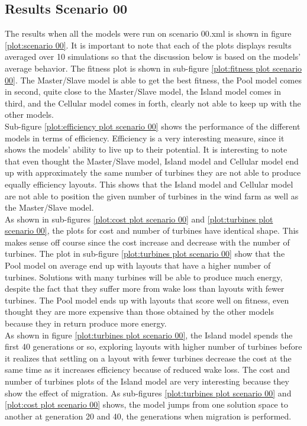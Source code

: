 \subsection{Results Scenario 00}
The results when all the models were run on scenario 00.xml is shown in figure \ref{plot:scenario 00}. It is important to note that each of the plots displays results averaged over 10 simulations so that the discussion below is based on the models' average behavior. The fitness plot is shown in sub-figure \ref{plot:fitness plot scenario 00}. The Master/Slave model is able to get the best fitness, the Pool model comes in second, quite close to the Master/Slave model, the Island model comes in third, and the Cellular model comes in forth, clearly not able to keep up with the other models.\\ 

\noindent Sub-figure \ref{plot:efficiency plot scenario 00} shows the performance of the different models in terms of efficiency. Efficiency is a very interesting measure, since it shows the models' ability to live up to their potential. It is interesting to note that even thought the Master/Slave model, Island model and Cellular model end up with approximately the same number of turbines they are not able to produce equally efficiency layouts. This shows that the Island model and Cellular model are not able to position the given number of turbines in the wind farm as well as the Master/Slave model.\\

\noindent As shown in sub-figures \ref{plot:cost plot scenario 00} and \ref{plot:turbines plot scenario 00}, the plots for cost and number of turbines have identical shape. This makes sense off course since the cost increase and decrease with the number of turbines. The plot in sub-figure \ref{plot:turbines plot scenario 00} show that the Pool model on average end up with layouts that have a higher number of turbines. Solutions with many turbines will be able to produce much energy, despite the fact that they suffer more from wake loss than layouts with fewer turbines. The Pool model ends up with layouts that score well on fitness, even thought they are more expensive than those obtained by the other models because they in return produce more energy.\\

\noindent As shown in figure \ref{plot:turbines plot scenario 00}, the Island model spends the first 40 generations or so, exploring layouts with higher number of turbines before it realizes that settling on a layout with fewer turbines decrease the cost at the same time as it increases efficiency because of reduced wake loss. The cost and number of turbines plots of the Island model are very interesting because they show the effect of migration. As sub-figures \ref{plot:turbines plot scenario 00} and \ref{plot:cost plot scenario 00} shows, the model jumps from one solution space to another at generation 20 and 40, the generations when migration is performed. \\

